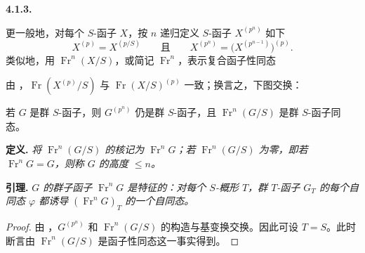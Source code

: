 
\medskip
\noindent\textbf{4.1.3.}
\label{sga3:VIIA:4.1.3}

更一般地，对每个 \(S\)-函子 \(X\)，按 \(n\) 递归定义 \(S\)-函子 \(X^{(p^n)}\) 如下
\[
  X^{(p)}=X^{(p/S)}
  \qquad\text{且}\qquad
  X^{(p^n)}
  =
  \bigl(X^{(p^{n-1})}\bigr)^{(p)}.
\]
类似地，用 \(\operatorname{Fr}^n(X/S)\)，或简记 \(\operatorname{Fr}^n\)，表示复合函子性同态
\begin{center}
  \label{sga3:VIIA:4.1.3-iterated-relative-frobenius-chain}
  
\end{center}
由 ，\(\operatorname{Fr}(X^{(p)}/S)\) 与 \(\operatorname{Fr}(X/S)^{(p)}\) 一致；换言之，下图交换：
\begin{center}
  \label{sga3:VIIA:4.1.3-iterated-frobenius-naturality-square}
  
\end{center}

若 \(G\) 是群 \(S\)-函子，则 \(G^{(p^n)}\) 仍是群 \(S\)-函子，且 \(\operatorname{Fr}^n(G/S)\) 是群 \(S\)-函子同态。

\medskip
\noindent\textbf{定义.}
\label{sga3:VIIA:4.1.3-height-definition}
\textit{将 \(\operatorname{Fr}^n(G/S)\) 的核记为 \(\operatorname{Fr}^nG\)；若 \(\operatorname{Fr}^n(G/S)\) 为零，即若 \(\operatorname{Fr}^nG=G\)，则称 \(G\) 的高度 \(\leq n\)。}

\medskip
\noindent\textbf{引理.}
\label{sga3:VIIA:4.1.3-characteristic-kernel-lemma}
\textit{\(G\) 的群子函子 \(\operatorname{Fr}^nG\) 是特征的：对每个 \(S\)-概形 \(T\)，群 \(T\)-函子 \(G_T\) 的每个自同态 \(\varphi\) 都诱导 \((\operatorname{Fr}^nG)_T\) 的一个自同态。}

\begin{proof}
由 ，\(G^{(p^n)}\) 和 \(\operatorname{Fr}^n(G/S)\) 的构造与基变换交换。因此可设 \(T=S\)。此时断言由 \(\operatorname{Fr}^n(G/S)\) 是函子性同态这一事实得到。
\end{proof}


